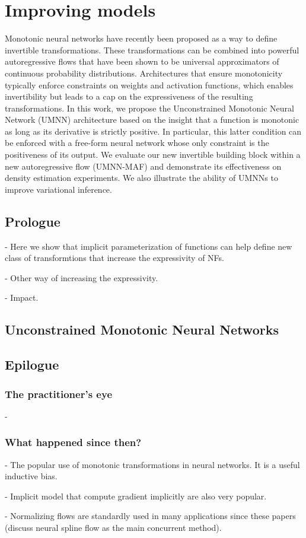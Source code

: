 \chapter{Improving models}\label{ch:05}

\begin{chapter_outline}

Monotonic neural networks have recently been proposed as a way to define invertible transformations.
These transformations can be combined into powerful autoregressive flows that have been shown to be universal approximators of continuous probability distributions.
Architectures that ensure monotonicity typically enforce constraints on weights and activation functions, which enables invertibility but leads to a cap on the expressiveness of the resulting transformations.
In this work, we propose the Unconstrained Monotonic Neural Network (UMNN) architecture based on the insight that a function is monotonic as long as its derivative is strictly positive. In particular, this latter condition can be enforced with a free-form neural network whose only constraint is the positiveness of its output.
We evaluate our new invertible building block within a new autoregressive flow (UMNN-MAF) and demonstrate its effectiveness on density estimation experiments.
We also illustrate the ability of UMNNs to improve variational inference.
\end{chapter_outline}

\section{Prologue}
- Here we show that implicit parameterization of functions can help define new class of transformtions that increase the expressivity of NFs.

- Other way of increasing the expressivity.

- Impact.

\section{Unconstrained Monotonic Neural Networks}


\section{Epilogue}

\subsection{The practitioner's eye}
-

\subsection{What happened since then?}
- The popular use of monotonic transformations in neural networks. It is a useful inductive bias.

- Implicit model that compute gradient implicitly are also very popular.

- Normalizing flows are standardly used in many applications since these papers (discuss neural spline flow as the main concurrent method).
